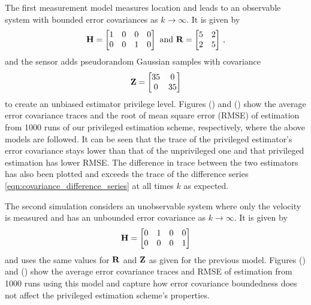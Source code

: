 \documentclass[letterpaper, 10 pt, conference]{IEEEtran}
\theoremstyle{definition}
\begin{document}
The first measurement model measures location and leads to an observable system with bounded error covariances as $k \rightarrow \infty$. It is given by
\begin{equation*}\label{eqn:bounded_sim_measurement_model}
   \mat{H}=
   \begin{bmatrix}
      1 & 0 & 0 & 0\\
      0 & 0 & 1 & 0
   \end{bmatrix}
   \text{ and }
   \mat{R}=
   \begin{bmatrix}
      5 & 2\\
      2 & 5
   \end{bmatrix}\,,
\end{equation*}
and the sensor adds pseudorandom Gaussian samples with covariance
\begin{equation*}
   {\ensuremath{{\mathbf{Z}}}}=
   \begin{bmatrix}
      35 & 0\\
      0 & 35
   \end{bmatrix}
\end{equation*}
to create an unbiased estimator privilege level. Figures () and () show the average error covariance traces and the root of mean square error (RMSE) of estimation from 1000 runs of our privileged estimation scheme, respectively, where the above models are followed. It can be seen that the trace of the privileged estimator's error covariance stays lower than that of the unprivileged one and that privileged estimation has lower RMSE. The difference in trace between the two estimators has also been plotted and exceeds the trace of the difference series \eqref{eqn:covariance_difference_series} at all times $k$ as expected.


The second simulation considers an unobservable system where only the velocity is measured and has an unbounded error covariance as $k \rightarrow \infty$. It is given by
\begin{equation*}
   {\ensuremath{{\mathbf{H}}}}=
   \begin{bmatrix}
      0 & 1 & 0 & 0\\
      0 & 0 & 0 & 1
   \end{bmatrix}
\end{equation*}
and uses the same values for ${{\mathbf{R}}}$ and ${{\mathbf{Z}}}$ as given for the previous model. Figures () and () show the average error covariance traces and RMSE of estimation from 1000 runs using this model and capture how error covariance boundedness does not affect the privileged estimation scheme's properties.
\end{document}

